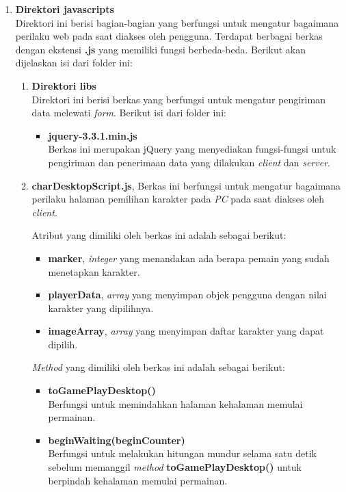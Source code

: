 \begin{enumerate}
\begin{enumerate}
		\item \textbf{Direktori javascripts} \\
		Direktori ini berisi bagian-bagian yang berfungsi untuk mengatur bagaimana perilaku web pada saat diakses oleh pengguna. Terdapat berbagai berkas dengan ekstensi \textbf{.js} yang memiliki fungsi berbeda-beda. Berikut akan dijelaskan isi dari folder ini:
		
		\begin{enumerate}
			\item \textbf{Direktori libs} \\
			Direktori ini berisi berkas yang berfungsi untuk mengatur pengiriman data melewati \textit{form}. Berikut isi dari folder ini:
			\begin{itemize}
				\item \textbf{jquery-3.3.1.min.js} \\ Berkas ini merupakan jQuery yang menyediakan fungsi-fungsi untuk pengiriman dan penerimaan data yang dilakukan \textit{client} dan \textit{server}. 
			\end{itemize}
		
			\item \textbf{charDesktopScript.js}, Berkas ini berfungsi untuk mengatur bagaimana perilaku halaman pemilihan karakter pada \textit{PC} pada saat diakses oleh \textit{client}.
			
			Atribut yang dimiliki oleh berkas ini adalah sebagai berikut:
			\begin{itemize}
				\item \textbf{marker}, \textit{integer} yang menandakan ada berapa pemain yang sudah menetapkan karakter.
				\item \textbf{playerData}, \textit{array} yang menyimpan objek pengguna dengan nilai karakter yang dipilihnya.
				\item \textbf{imageArray}, \textit{array} yang menyimpan daftar karakter yang dapat dipilih.
			\end{itemize}
		
			\textit{Method} yang dimiliki oleh berkas ini adalah sebagai berikut:
			\begin{itemize}
				\item \textbf{toGamePlayDesktop()} \\
				Berfungsi untuk memindahkan halaman kehalaman memulai permainan.
				
				\item \textbf{beginWaiting(beginCounter)} \\
				Berfungsi untuk melakukan hitungan mundur selama satu detik sebelum memanggil \textit{method} \textbf{toGamePlayDesktop()} untuk berpindah kehalaman memulai permainan.
			\end{itemize}
		

\end{enumerate}
\end{enumerate}
\end{enumerate}
